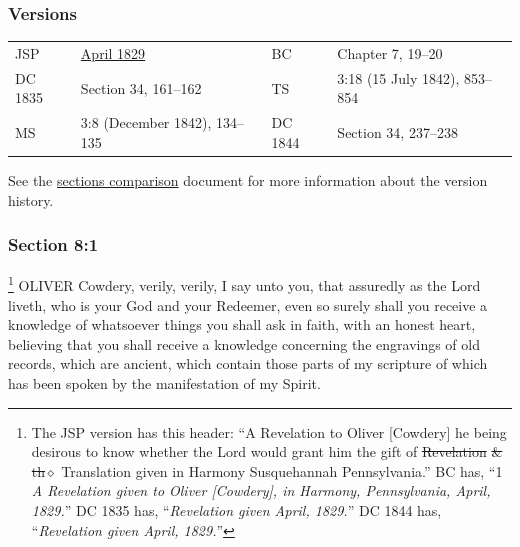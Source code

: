 	\subsubsection{Versions}
		\label{DC8-V}
	
		\begin{tabular}{p{1in}p{2in}p{1in}p{2in}}
			JSP		& \hyperref[EMS-1828-1829-JS-APR-1829-B]{April 1829}	& BC	& Chapter 7, 19--20 \\
			DC 1835 & Section 34, 161--162									& TS	& 3:18 (15 July 1842), 853--854 \\
			MS		& 3:8 (December 1842), 134--135							& DC 1844	&  Section 34, 237--238 \\
		\end{tabular}
		
		\medskip
		
		See the \href{https://drive.google.com/file/d/1goAvNz8jS4R8slYfMG_db55Ty2z_vmgK/view?usp=sharing}{sections comparison} document for more information about the version history.

	\subsubsection{Section 8:1} %
		\label{DC8-1}

			\footnote{%
				The JSP version has this header: ``A Revelation to Oliver [Cowdery] he being desirous to know whether the Lord would grant him the gift of \sout{Revelation} \sout{\& th$\diamond$} Translation given in Harmony Susquehannah Pennsylvania.'' BC has, ``1 \textit{A Revelation given to Oliver [Cowdery], in Harmony, Pennsylvania, April, 1829.}'' DC 1835 has, ``\textit{Revelation given April, 1829.}'' DC 1844 has, ``\textit{Revelation given April, 1829.}''
				}%
		OLIVER Cowdery, verily, verily, I say unto you, that assuredly as the Lord liveth, who is your God and your Redeemer, even so surely shall you receive a knowledge of whatsoever things you shall ask in faith, with an honest heart, believing that you shall receive a knowledge concerning the engravings of old records, which are ancient, which contain those parts of my scripture of which has been spoken by the manifestation of my Spirit.


